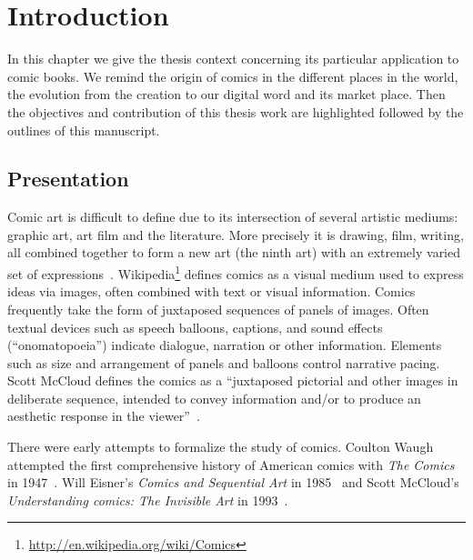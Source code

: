 \chapter{Introduction}%
\label{chap:intro}
\graphicspath{{./chapters/1-intro/figs/}}

In this chapter we give the thesis context concerning its particular application to comic books.
We remind the origin of comics in the different places in the world, the evolution from the creation to our digital word and its market place.
Then the objectives and contribution of this thesis work are highlighted followed by the outlines of this manuscript.


\section{Presentation} %
\label{sec:presentation}
Comic art is difficult to define due to its intersection of several artistic mediums: graphic art, art film and the literature.
More precisely it is drawing, film, writing, all combined together to form a new art (the ninth art) with an extremely varied set of expressions~\cite{duc1997art}.
Wikipedia\footnote{\url{http://en.wikipedia.org/wiki/Comics}} defines comics as a visual medium used to express ideas via images, often combined with text or visual information.
Comics frequently take the form of juxtaposed sequences of panels of images.
Often textual devices such as speech balloons, captions, and sound effects (``onomatopoeia'') indicate dialogue, narration or other information.
Elements such as size and arrangement of panels and balloons control narrative pacing.
Scott McCloud defines the comics as a ``juxtaposed pictorial and other images in deliberate sequence, intended to convey information and/or to produce an aesthetic response in the viewer''~\cite{mccloud1994understanding}.

There were early attempts to formalize the study of comics. 
Coulton Waugh attempted the first comprehensive history of American comics with \emph{The Comics} in 1947~\cite{Coulton1947Comics}.
Will Eisner's \emph{Comics and Sequential Art} in 1985~\cite{Eisner1985Comics} and Scott McCloud's \emph{Understanding comics: The Invisible Art} in 1993~\cite{mccloud1994understanding}.


